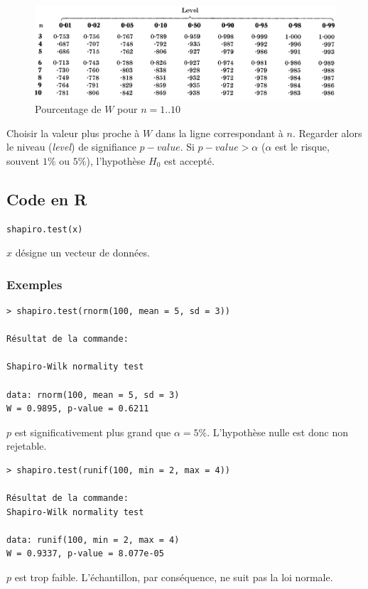 \documentclass[12pt,a4paper]{article}
\begin{document}
\begin{enumerate}
\begin{figure}[!h]
\centering
\includegraphics[width=\textwidth]{images/ShapiroWilk_Percentage.png}
\caption{Pourcentage de $W$ pour $n=1..10$}
\label{ShapiroWilkTablePourcentage}
\end{figure}
Choisir la valeur plus proche à $W$ dans la ligne correspondant à $n$. Regarder alors le niveau (\emph{level}) de signifiance $p-value$. Si $p-value > \alpha$ ($\alpha$ est le risque, souvent $1\%$ ou $5\%$), l'hypothèse $H_0$ est accepté.
\end{enumerate}
\subsection{Code en R}
\begin{verbatim}
shapiro.test(x)
\end{verbatim}

$x$ désigne un vecteur de données.

\subsubsection*{Exemples}
\begin{verbatim}
> shapiro.test(rnorm(100, mean = 5, sd = 3))

Résultat de la commande:

Shapiro-Wilk normality test

data: rnorm(100, mean = 5, sd = 3)
W = 0.9895, p-value = 0.6211
\end{verbatim}

$p$ est significativement plus grand que $\alpha=5\%$. L'hypothèse nulle est donc non rejetable.

\begin{verbatim}
> shapiro.test(runif(100, min = 2, max = 4))

Résultat de la commande:
Shapiro-Wilk normality test

data: runif(100, min = 2, max = 4)
W = 0.9337, p-value = 8.077e-05
\end{verbatim}

$p$ est trop faible. L'échantillon, par conséquence, ne suit pas la loi normale.
\end{document}
